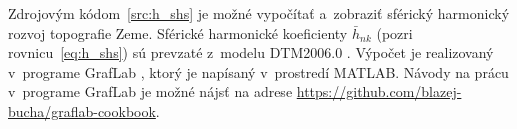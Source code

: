 \documentclass[a4paper,12pt]{book}
\begin{document}
Zdrojovým kódom~\ref{src:h_shs} je možné vypočítať a~zobraziť sférický 
harmonický rozvoj topografie Zeme.  Sférické harmonické koeficienty 
$\bar{h}_{nk}$ (pozri rovnicu~\ref{eq:h_shs}) sú prevzaté z~modelu DTM2006.0 
\parencite{DTM2006}.  Výpočet je realizovaný v~programe GrafLab 
\parencite{GrafLab}, ktorý je napísaný v~prostredí MATLAB.  Návody na prácu 
v~programe GrafLab je možné nájsť na adrese 
\url{https://github.com/blazej-bucha/graflab-cookbook}.








\printbibliography[title=Literat\'{u}ra]

\end{document}
